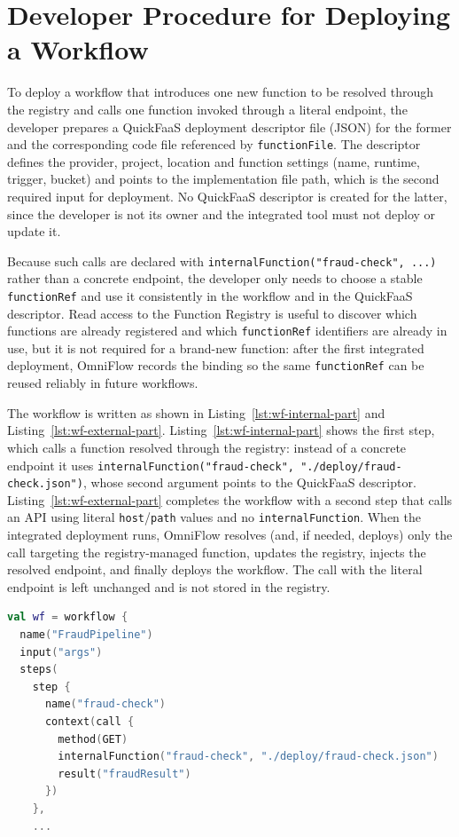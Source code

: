 \section{Developer Procedure for Deploying a Workflow}
\label{sec:developer-workflow}

To deploy a workflow that introduces one new function to be resolved through the registry and calls one function invoked through a literal endpoint, the developer prepares a QuickFaaS deployment descriptor file (JSON) for the former and the corresponding code file referenced by \texttt{functionFile}. The descriptor defines the provider, project, location and function settings (name, runtime, trigger, bucket) and points to the implementation file path, which is the second required input for deployment. No QuickFaaS descriptor is created for the latter, since the developer is not its owner and the integrated tool must not deploy or update it.

Because such calls are declared with \texttt{internalFunction("fraud-check", ...)} rather than a concrete endpoint, the developer only needs to choose a stable \texttt{functionRef} and use it consistently in the workflow and in the QuickFaaS descriptor. Read access to the Function Registry is useful to discover which functions are already registered and which \texttt{functionRef} identifiers are already in use, but it is not required for a brand-new function: after the first integrated deployment, OmniFlow records the binding so the same \texttt{functionRef} can be reused reliably in future workflows.

The workflow is written as shown in Listing~\ref{lst:wf-internal-part} and Listing~\ref{lst:wf-external-part}. Listing~\ref{lst:wf-internal-part} shows the first step, which calls a function resolved through the registry: instead of a concrete endpoint it uses \texttt{internalFunction("fraud-check", "./deploy/fraud-check.json")}, whose second argument points to the QuickFaaS descriptor. Listing~\ref{lst:wf-external-part} completes the workflow with a second step that calls an API using literal \texttt{host}/\texttt{path} values and no \texttt{internalFunction}. When the integrated deployment runs, OmniFlow resolves (and, if needed, deploys) only the call targeting the registry-managed function, updates the registry, injects the resolved endpoint, and finally deploys the workflow. The call with the literal endpoint is left unchanged and is not stored in the registry.

\begin{lstlisting}[language=Kotlin,caption={FraudPipeline workflow (part 1/2): call resolved through the registry.},label={lst:wf-internal-part},basicstyle=\ttfamily\small,breaklines=false]
val wf = workflow {
  name("FraudPipeline")
  input("args")
  steps(
    step {
      name("fraud-check")
      context(call {
        method(GET)
        internalFunction("fraud-check", "./deploy/fraud-check.json")
        result("fraudResult")
      })
    },
    ...
\end{lstlisting}

